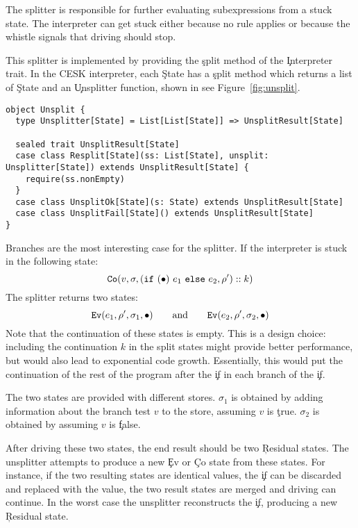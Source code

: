 The splitter is responsible for further evaluating subexpressions from
a stuck state. The interpreter can get stuck either because no rule applies
or because the whistle signals that driving should stop.

This splitter is implemented by providing the \c{split} method of the \c{Interpreter}
trait. In the CESK interpreter, each \c{State} has a \c{split} method
which returns a list of \c{State} and an \c{Unsplitter} function, shown
in see Figure~\ref{fig:unsplit}.

\begin{figure*}
\begin{verbatim}
object Unsplit {
  type Unsplitter[State] = List[List[State]] => UnsplitResult[State]

  sealed trait UnsplitResult[State]
  case class Resplit[State](ss: List[State], unsplit: Unsplitter[State]) extends UnsplitResult[State] {
    require(ss.nonEmpty)
  }
  case class UnsplitOk[State](s: State) extends UnsplitResult[State]
  case class UnsplitFail[State]() extends UnsplitResult[State]
}
\end{verbatim}
\caption{Unsplitter interface}
\label{fig:unsplit}
\end{figure*}

Branches are the most interesting case for the splitter.
If the interpreter is stuck in the following state:
\[
    \c{Co}(v, \sigma, \branch{e_1}{e_2}{\rho'}::k)
\]
The splitter returns two states:
\[
    \c{Ev}(e_1, \rho', \sigma_1, \bullet)
    \quad
    \quad
    \mbox{and}
    \quad
    \quad
    \c{Ev}(e_2, \rho', \sigma_2, \bullet)
\]
Note that the continuation of these states is empty.
This is a design choice: including the continuation $k$ in the split states
might provide better performance, but would also lead to exponential code
growth. Essentially, this would put the continuation of the rest of the
program after the \c{if} in each branch of the \c{if}.

The two states are provided with different stores.
$\sigma_1$ is obtained by adding information about the branch test
$v$ to the store, assuming $v$ is \c{true}.
$\sigma_2$ is obtained by assuming $v$ is \c{false}.

After driving these two states,
the end result should be two \c{Residual} states.
The unsplitter attempts to produce a new \c{Ev} or \c{Co} state from these states.
For instance, if the two resulting states are identical values, the \c{if}
can be discarded and replaced with the value, the two result states are merged
and driving can continue.
In the worst case the unsplitter
reconstructs the \c{if}, producing a new \c{Residual} state.

